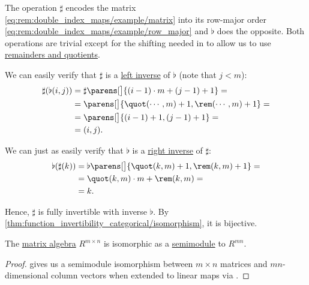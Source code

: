 \begin{remark}
  The operation \( \sharp \) encodes the matrix \eqref{eq:rem:double_index_maps/example/matrix} into its row-major order \eqref{eq:rem:double_index_maps/example/row_major} and \( \flat \) does the opposite. Both operations are trivial except for the shifting needed in to allow us to use \hyperref[def:euclidean_domain]{remainders and quotients}.

  We can easily verify that \( \sharp \) is a \hyperref[def:morphism_invertibility/left]{left inverse} of \( \flat \) (note that \( j < m \)):
  \begin{align*}
    \sharp(\flat(i, j))
    &=
    \sharp\parens[\big]{ (i - 1) \cdot m + (j - 1) + 1 }
    = \\ &=
    \parens[\big]{ \quot(\cdots, m) + 1, \rem(\cdots, m) + 1 }
    = \\ &=
    \parens[\big]{ (i - 1) + 1, (j - 1) + 1 }
    = \\ &=
    (i, j).
  \end{align*}

  We can just as easily verify that \( \flat \) is a \hyperref[def:morphism_invertibility/right]{right inverse} of \( \sharp \):
  \begin{align*}
    \flat(\sharp(k))
    &=
    \flat\parens[\big]{ \quot(k, m) + 1, \rem(k, m) + 1 }
    = \\ &=
    \quot(k, m) \cdot m + \rem(k, m)
    = \\ &=
    k.
  \end{align*}

  Hence, \( \sharp \) is fully invertible with inverse \( \flat \). By \cref{thm:function_invertibility_categorical/isomorphism}, it is bijective.
\end{remark}

\begin{proposition}\label{thm:matrix_spaces_are_free_modules}
  The \hyperref[thm:matrix_algebra]{matrix algebra} \( R^{m \times n} \) is isomorphic as a \hyperref[def:semimodule]{semimodule} to \( R^{mn} \).
\end{proposition}
\begin{proof}
   gives us a semimodule isomorphism between \( m \times n \) matrices and \( mn \)-dimensional column vectors when extended to linear maps via .
\end{proof}

